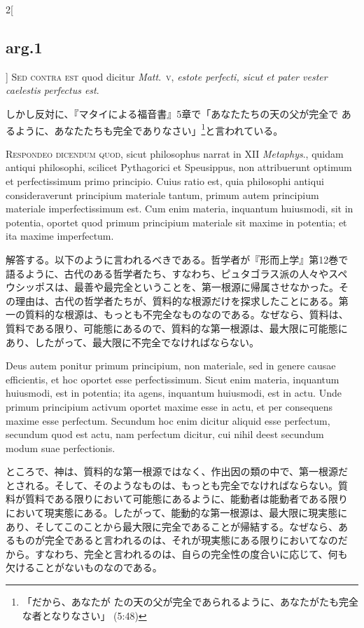 \documentclass[paper=a4paper,fontsize=10pt,jafontsize=9pt,titlepage]{jlreq}
\begin{document}
\begin{paracol}{2}[\subsection{arg.1}]
{\scshape Sed contra est} quod dicitur {\itshape Matt}.~{\scshape v},
 {\itshape estote perfecti, sicut et pater vester caelestis perfectus
 est}.

\switchcolumn

しかし反対に、『マタイによる福音書』5章で「あなたたちの天の父が完全で
あるように、あなたたちも完全でありなさい」\footnote{「だから、あなたが
たの天の父が完全であられるように、あなたがたも完全な者となりなさい」
(5:48)}と言われている。


{\scshape Respondeo dicendum quod}, sicut philosophus narrat in XII
{\itshape Metaphys}., quidam antiqui philosophi, scilicet Pythagorici
et Speusippus, non attribuerunt optimum et perfectissimum primo
principio. Cuius ratio est, quia philosophi antiqui consideraverunt
principium materiale tantum, primum autem principium materiale
imperfectissimum est. Cum enim materia, inquantum huiusmodi, sit in
potentia, oportet quod primum principium materiale sit maxime in
potentia; et ita maxime imperfectum.

\switchcolumn

解答する。以下のように言われるべきである。哲学者が『形而上学』第12巻で
語るように、古代のある哲学者たち、すなわち、ピュタゴラス派の人々やスペ
ウシッポスは、最善や最完全ということを、第一根源に帰属させなかった。そ
の理由は、古代の哲学者たちが、質料的な根源だけを探求したことにある。第
一の質料的な根源は、もっとも不完全なものなのである。なぜなら、質料は、
質料である限り、可能態にあるので、質料的な第一根源は、最大限に可能態に
あり、したがって、最大限に不完全でなければならない。

\switchcolumn*

Deus autem ponitur primum principium, non materiale, sed in genere
causae efficientis, et hoc oportet esse perfectissimum. Sicut enim
materia, inquantum huiusmodi, est in potentia; ita agens, inquantum
huiusmodi, est in actu. Unde primum principium activum oportet maxime
esse in actu, et per consequens maxime esse perfectum. Secundum hoc
enim dicitur aliquid esse perfectum, secundum quod est actu, nam
perfectum dicitur, cui nihil deest secundum modum suae perfectionis.

\switchcolumn

ところで、神は、質料的な第一根源ではなく、作出因の類の中で、第一根源だ
とされる。そして、そのようなものは、もっとも完全でなければならない。質
料が質料である限りにおいて可能態にあるように、能動者は能動者である限り
において現実態にある。したがって、能動的な第一根源は、最大限に現実態に
あり、そしてこのことから最大限に完全であることが帰結する。なぜなら、あ
るものが完全であると言われるのは、それが現実態にある限りにおいてなのだ
から。すなわち、完全と言われるのは、自らの完全性の度合いに応じて、何も
欠けることがないものなのである。


\end{paracol}
\end{document}
